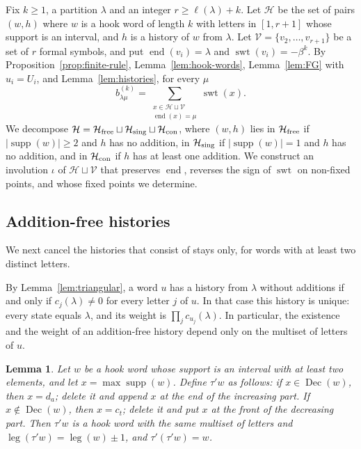 \documentclass[11pt]{amsart}
\numberwithin{equation}{section}
\newtheorem{lemma}[theorem]{Lemma}
\theoremstyle{definition}
\theoremstyle{remark}
\newcommand{\swt}{\operatorname{swt}}
\newcommand{\leg}{\operatorname{leg}}
\newcommand{\supp}{\operatorname{supp}}
\newcommand{\Dec}{\operatorname{Dec}}
\newcommand{\enD}{\operatorname{end}}
\newcommand{\cH}{\mathcal H}
\begin{document}
Fix $k\geq1$, a partition $\lambda$ and an integer $r\geq\ell(\lambda)+k$. Let
$\cH$ be the set of pairs $(w,h)$ where $w$ is a hook word of length $k$
with letters in $[1,r+1]$ whose support is an interval, and $h$ is a
history of $w$ from $\lambda$. Let $\mathcal V=\{v_2,\dots,v_{r+1}\}$ be a set
of $r$ formal symbols, and put $\enD(v_i)=\lambda$ and $\swt(v_i)=-\beta^k$.
By Proposition~\ref{prop:finite-rule}, Lemma~\ref{lem:hook-words},
Lemma~\ref{lem:FG} with $u_i=U_i$, and Lemma~\ref{lem:histories}, for every
$\mu$
\begin{equation}\label{eq:signed-set}
 b^{(k)}_{\lambda\mu}=\sum_{\substack{x\in\cH\sqcup\mathcal V\\ \enD(x)=\mu}}\swt(x).
\end{equation}
We decompose $\cH=\cH_{\rm free}\sqcup\cH_{\rm sing}\sqcup\cH_{\rm con}$, where
$(w,h)$ lies in $\cH_{\rm free}$ if $|\supp(w)|\geq2$ and $h$ has no
addition, in $\cH_{\rm sing}$ if $|\supp(w)|=1$ and $h$ has no addition, and
in $\cH_{\rm con}$ if $h$ has at least one addition. We construct an
involution $\iota$ of $\cH\sqcup\mathcal V$ that preserves $\enD$, reverses
the sign of $\swt$ on non-fixed points, and whose fixed points we
determine.

\subsection{Addition-free histories}

We next cancel the histories that consist of stays only, for words with at
least two distinct letters.

By Lemma~\ref{lem:triangular}, a word $u$ has a history from $\lambda$
without additions if and only if $c_j(\lambda)\neq0$ for every letter $j$ of
$u$. In that case this history is unique: every state equals $\lambda$, and
its weight is $\prod_jc_{u_j}(\lambda)$. In particular, the existence and the
weight of an addition-free history depend only on the multiset of letters
of $u$.

\begin{lemma}\label{lem:tau-prime}
Let $w$ be a hook word whose support is an interval with at least two
elements, and let $x=\max\supp(w)$. Define $\tau'w$ as follows: if
$x\in\Dec(w)$, then $x=d_a$; delete it and append $x$ at the end of the
increasing part. If $x\notin\Dec(w)$, then $x=c_t$; delete it and put $x$ at
the front of the decreasing part. Then $\tau'w$ is a hook word with the same
multiset of letters and $\leg(\tau'w)=\leg(w)\pm1$, and $\tau'(\tau'w)=w$.
\end{lemma}
\end{document}
